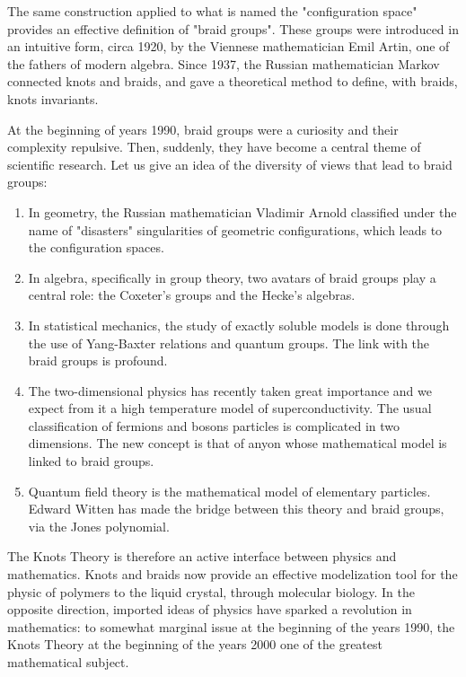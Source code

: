 {	The same construction applied to what is named the "configuration space" provides an effective definition of "braid groups". These groups were introduced in an intuitive form, circa 1920, by the Viennese mathematician Emil Artin, one of the fathers of modern algebra. Since 1937, the Russian mathematician Markov connected knots and braids, and gave a theoretical method to define, with braids, knots invariants.
	
	At the beginning of years 1990, braid groups were a curiosity and their complexity repulsive. Then, suddenly, they have become a central theme of scientific research. Let us give an idea of the diversity of views that lead to braid groups:
	\begin{enumerate}
		\item In geometry, the Russian mathematician Vladimir Arnold classified under the name of "disasters" singularities of geometric configurations, which leads to the configuration spaces.
		
		\item In algebra, specifically in group theory, two avatars of braid groups play a central role: the Coxeter's groups and the Hecke's algebras.
		
		\item In statistical mechanics, the study of exactly soluble models is done through the use of Yang-Baxter relations and quantum groups. The link with the braid groups is profound.
		
		\item The two-dimensional physics has recently taken great importance and we expect from it a high temperature model of superconductivity. The usual classification of fermions and bosons particles is complicated in two dimensions. The new concept is that of anyon whose mathematical model is linked to braid groups.
		
		\item Quantum field theory is the mathematical model of elementary particles. Edward Witten has made the bridge between this theory and braid groups, via the Jones polynomial.
	\end{enumerate}
	The Knots Theory is therefore an active interface between physics and mathematics. Knots and braids now provide an effective modelization tool for the physic of polymers to the liquid crystal, through molecular biology. In the opposite direction, imported ideas of physics have sparked a revolution in mathematics: to somewhat marginal issue at the beginning of the years 1990, the Knots Theory at the beginning of the years 2000 one of the greatest mathematical subject.
	
}
